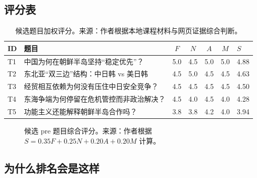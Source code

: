 \documentclass[a4paper]{article}
\begin{document}
\subsection{评分表}

\begin{table}[H]
\centering
\small
\begin{tabularx}{\textwidth}{p{0.8cm}Yccccp{1.2cm}}
\toprule
\textbf{ID} & \textbf{题目} & \textbf{$F$} & \textbf{$N$} & \textbf{$A$} & \textbf{$M$} & \textbf{$S$} \\
\midrule
T1 & 中国为何在朝鲜半岛坚持``稳定优先''？ & 5.0 & 4.5 & 5.0 & 5.0 & 4.88 \\
T2 & 东北亚``双三边''结构：中日韩 vs 美日韩 & 4.5 & 5.0 & 4.5 & 4.5 & 4.63 \\
T3 & 经贸相互依赖为何没有压住中日安全竞争？ & 4.5 & 4.5 & 4.5 & 4.5 & 4.50 \\
T4 & 东海争端为何停留在危机管控而非政治解决？ & 4.5 & 4.0 & 4.5 & 4.0 & 4.28 \\
T5 & 功能主义还能解释朝鲜半岛合作吗？ & 3.8 & 3.8 & 4.2 & 4.0 & 3.94 \\
\bottomrule
\end{tabularx}
\caption{候选题目加权评分。来源：作者根据本地课程材料与网页证据综合判断。}
\end{table}

\begin{figure}[H]
\centering
{}
\caption{候选 pre 题目综合评分。来源：作者根据 $S = 0.35F + 0.25N + 0.20A + 0.20M$ 计算。}
\end{figure}

\subsection{为什么排名会是这样}
\end{document}

